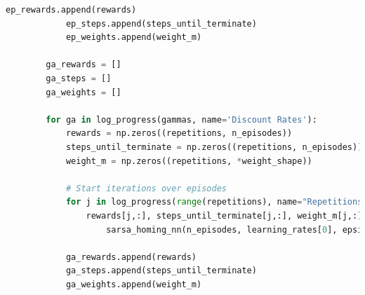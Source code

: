 \documentclass[11pt,journal,transmag,final]{IEEEtran}
\begin{document}
\begin{appendices}
\begin{lstlisting}[language=Python, caption=Running Several Experiments, basicstyle=\footnotesize, label=lst:experiments]
            ep_rewards.append(rewards)
            ep_steps.append(steps_until_terminate)
            ep_weights.append(weight_m)
            
        ga_rewards = []
        ga_steps = []
        ga_weights = []
        
        for ga in log_progress(gammas, name='Discount Rates'):
            rewards = np.zeros((repetitions, n_episodes))
            steps_until_terminate = np.zeros((repetitions, n_episodes))
            weight_m = np.zeros((repetitions, *weight_shape))
        
            # Start iterations over episodes
            for j in log_progress(range(repetitions), name="Repetitions"):
                rewards[j,:], steps_until_terminate[j,:], weight_m[j,:] =
                    sarsa_homing_nn(n_episodes, learning_rates[0], epsilons[0], ga)
            
            ga_rewards.append(rewards)
            ga_steps.append(steps_until_terminate)
            ga_weights.append(weight_m)
        \end{lstlisting}
    \end{appendices}

     
    
\end{document}
